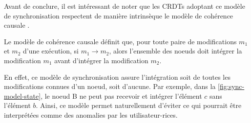 Avant de conclure, il est intéressant de noter que les \acp{CRDT} adoptant ce modèle de synchronisation respectent de manière intrinsèque le modèle de cohérence causale \cite{1995-causal-memory-ahamad-neiger,2011-consistency-availability-convergence-mahajan}.

\begin{definition}
  \label{def:causal-consistency}
  Le modèle de cohérence causale définit que, pour toute paire de modifications $m_1$ et $m_2$ d'une exécution, si $m_1 \to m_2$, alors l'ensemble des noeuds doit intégrer la modification $m_1$ avant d'intégrer la modification $m_2$.
\end{definition}

En effet, ce modèle de synchronisation assure l'intégration soit de toutes les modifications connues d'un noeud, soit d'aucune.
Par exemple, dans la \autoref{fig:sync-model-state}, le noeud B ne peut pas recevoir et intégrer l'élément $c$ sans l'élément $b$.
Ainsi, ce modèle permet naturellement d'éviter ce qui pourrait être interprétées comme des anomalies par les utilisateur-rices.
